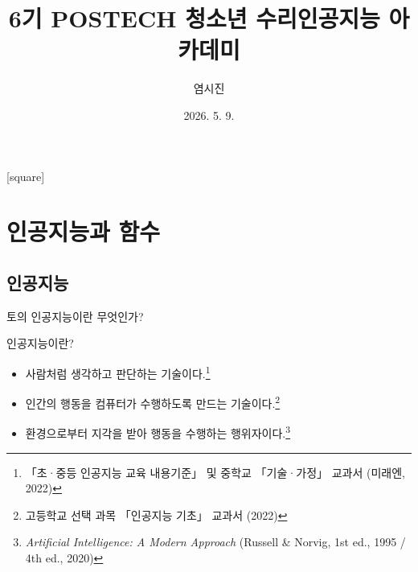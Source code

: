 \documentclass{beamer}
\renewcommand{\arraystretch}{1.5}
\theoremstyle{definition}
\numberwithin{theorem}{section}
\begin{document}



\title{6기 POSTECH 청소년 수리인공지능 아카데미}
\author{염시진}
\date{2026. 5. 9.}


\begin{frame}
  \titlepage 
\end{frame}



\renewcommand{\arraystretch}{1.5}
[square]


\section{인공지능과 함수}


\subsection{인공지능}

\begin{frame}{토의}
\centering
\Huge
    \textcolor{Sogang}{인공지능}이란 무엇인가?
\end{frame}




\begin{frame}{인공지능이란?}

\begin{itemize}\setlength{\itemsep}{8pt}
    \item[1.] 사람처럼 생각하고 판단하는 기술이다.\footnote{「초·중등 인공지능 교육 내용기준」 및 중학교 「기술·가정」 교과서 (미래엔, 2022)}
    
    \item[2.] 인간의 행동을 컴퓨터가 수행하도록 만드는 기술이다.\footnote{고등학교 선택 과목 「인공지능 기초」 교과서 (2022)}
    
    \item[3.] 환경으로부터 지각을 받아 행동을 수행하는 행위자이다.\footnote{\textit{Artificial Intelligence: A Modern Approach} (Russell \& Norvig, 1st ed., 1995 / 4th ed., 2020)}
\end{itemize}

\end{frame}
\end{document}
